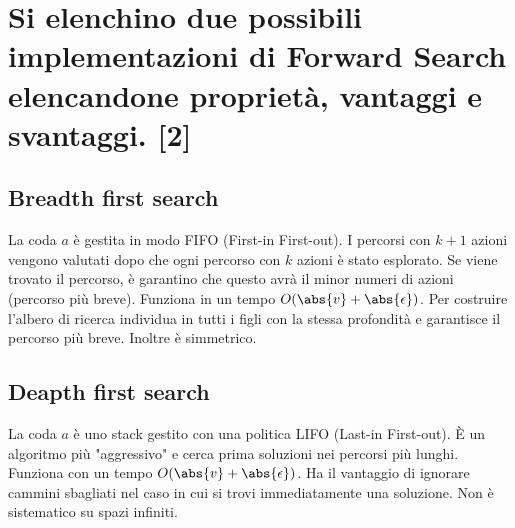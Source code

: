 \documentclass[\main/main.tex]{subfiles}
\begin{document}
\section{Si elenchino due possibili implementazioni di Forward Search elencandone proprietà, vantaggi e svantaggi. [2]}

\subsection{Breadth first search}
La coda $a$ è gestita in modo FIFO (First-in First-out). I percorsi con $k+1$ azioni vengono valutati dopo che ogni percorso con $k$ azioni è stato esplorato. Se viene trovato il percorso, è garantino che questo avrà il minor numeri di azioni (percorso più breve). 
Funziona in un tempo $O(\abs{v}+ \abs{\epsilon})$.
Per costruire l'albero di ricerca individua in tutti i figli con la stessa profondità e garantisce il percorso più breve. Inoltre è simmetrico.

\subsection{Deapth first search}
La coda $a$ è uno stack gestito con una politica LIFO (Last-in First-out). È un algoritmo più "aggressivo" e cerca prima soluzioni nei percorsi più lunghi.
Funziona con un tempo $O(\abs{v}+ \abs{\epsilon})$.
Ha il vantaggio di ignorare cammini sbagliati nel caso in cui si trovi immediatamente una soluzione.
Non è sistematico su spazi infiniti.
\end{document}
